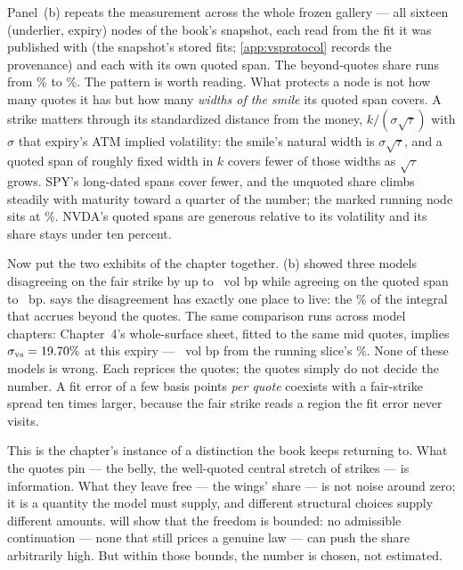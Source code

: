 Panel~(b) repeats the measurement across the whole frozen gallery ---
all sixteen (underlier, expiry) nodes of the book's snapshot, each
read from the fit it was published with (the snapshot's stored fits;
\cref{app:vsprotocol} records the provenance) and each with its own
quoted span.  The beyond-quotes share runs from
\MacVsShareGalleryMinPct\% to \MacVsShareGalleryMaxPct\%.  The
pattern is worth reading.  What protects a node is not how many
quotes it has but how many \emph{widths of the smile} its quoted span
covers.  A strike matters through its standardized distance from the
money, $k/(\sigma\sqrt\tau)$ with $\sigma$ that expiry's ATM implied
volatility: the smile's natural width is $\sigma\sqrt\tau$, and a
quoted span of roughly fixed width in $k$ covers fewer of those
widths as $\sqrt\tau$ grows.  SPY's long-dated spans cover fewer, and
the unquoted share climbs steadily with maturity toward a quarter of
the number; the marked running node sits at \MacVsShareBeyondPct\%.
NVDA's quoted spans are generous relative to its volatility and its
share stays under ten percent.

Now put the two exhibits of the chapter together.
(b) showed three models disagreeing on the fair
strike by up to \MacVsPinsMaxGapBp\ vol bp while agreeing on the
quoted span to \MacVsPinsBellyAgreeBp\ bp.   says
the disagreement has exactly one place to live: the
\MacVsShareBeyondPct\% of the integral that accrues beyond the
quotes.  The same comparison runs across model chapters: Chapter~4's
whole-surface sheet, fitted to the same mid quotes, implies
$\sigma_{\rm vs}=19.70\%$ at this expiry ---
\MacVsLvGapBp\ vol bp from the running slice's
\MacVsThreeSvsPct\%.  None of these models is wrong.  Each reprices
the quotes; the quotes simply do not decide the number.  A fit error
of a few basis points \emph{per quote} coexists with a fair-strike
spread ten times larger, because the fair strike reads a region the
fit error never visits.

This is the chapter's instance of a distinction the book keeps
returning to.  What the quotes pin --- the belly, the well-quoted
central stretch of strikes --- is information.  What they leave free
--- the wings' share --- is not noise around zero; it is a quantity
the model must supply, and different structural choices supply
different amounts.   will show
that the freedom is bounded: no admissible continuation --- none that
still prices a genuine law --- can push the share arbitrarily high.
But within those bounds, the number is chosen, not estimated.

